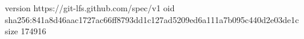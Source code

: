 version https://git-lfs.github.com/spec/v1
oid sha256:841a8d46aac1727ac66ff8793dd1c127ad5209ed6a111a7b095c440d2e03de1c
size 174916
